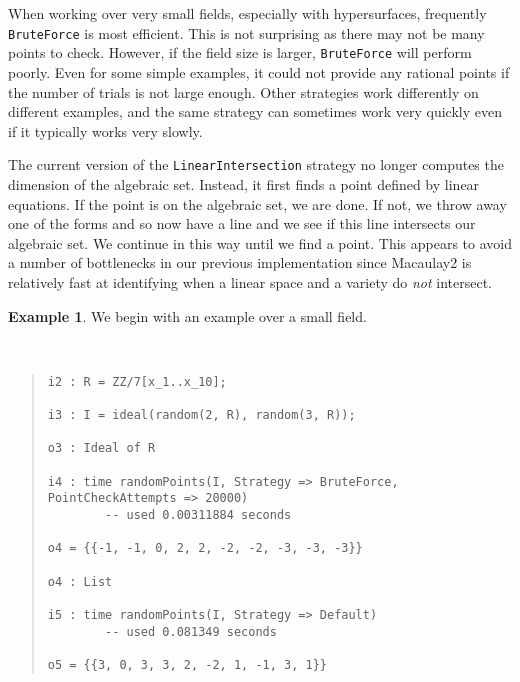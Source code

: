 \documentclass[11pt]{amsart}
\theoremstyle{definition}
\newtheorem{example}{Example}[section]
\begin{document}
    When working over very small fields, especially with hypersurfaces, frequently {\tt BruteForce} is most efficient.  This is not surprising as there may not be many points to check.  However, if the field size is larger, {\tt BruteForce} will perform poorly.  Even for some simple examples, it could not provide any rational points if the number of trials is not large enough.  Other strategies work differently on different examples, and the same strategy can sometimes work very quickly even if it typically works very slowly.  

    The current version of the {\tt LinearIntersection} strategy no longer computes the dimension of the algebraic set.  Instead, it first finds a point defined by linear equations.  If the point is on the algebraic set, we are done.  If not, we throw away one of the forms and so now have a line and we see if this line intersects our algebraic set.  We continue in this way until we find a point.  This appears to avoid a number of bottlenecks in our previous implementation since Macaulay2 is relatively fast at identifying when a linear space and a variety do \emph{not} intersect.  
    


    \begin{example}
        We begin with an example over a small field.
    {{\small\color{blue}
    ~~
    \begin{quote}
\begin{verbatim}
i2 : R = ZZ/7[x_1..x_10];

i3 : I = ideal(random(2, R), random(3, R));

o3 : Ideal of R

i4 : time randomPoints(I, Strategy => BruteForce, PointCheckAttempts => 20000)
        -- used 0.00311884 seconds        

o4 = {{-1, -1, 0, 2, 2, -2, -2, -3, -3, -3}}

o4 : List

i5 : time randomPoints(I, Strategy => Default)
        -- used 0.081349 seconds          

o5 = {{3, 0, 3, 3, 2, -2, 1, -1, 3, 1}}
\end{verbatim}
\end{quote}\vspace{-1em}
    }}
    \end{example}    
\end{document}
